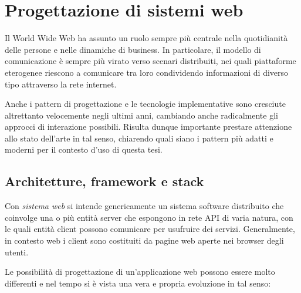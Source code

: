 \chapter{Progettazione di sistemi web}\label{chap:web}
  Il World Wide Web ha assunto un ruolo sempre più centrale nella quotidianità delle persone e nelle dinamiche di business.
  In particolare, il modello di comunicazione è sempre più virato verso scenari distribuiti,
  nei quali piattaforme eterogenee riescono a comunicare tra loro condividendo informazioni di diverso tipo attraverso la rete internet.

  Anche i pattern di progettazione e le tecnologie implementative sono cresciute altrettanto velocemente negli ultimi anni, cambiando anche radicalmente gli approcci di interazione possibili.
  Risulta dunque importante prestare attenzione allo stato dell'arte in tal senso, chiarendo quali siano i pattern più adatti e moderni per il contesto d'uso di questa tesi.

  \section{Architetture, framework e stack}\label{sec:web-architecture}

  Con \emph{sistema web} si intende genericamente un sistema software distribuito che coinvolge una o più entità server che espongono in rete API di varia natura, con le quali entità client possono comunicare per usufruire dei servizi.
  Generalmente, in contesto web i client sono costituiti da pagine web aperte nei browser degli utenti.

  Le possibilità di progettazione di un'applicazione web possono essere molto differenti e nel tempo si è vista una vera e propria evoluzione in tal senso:

